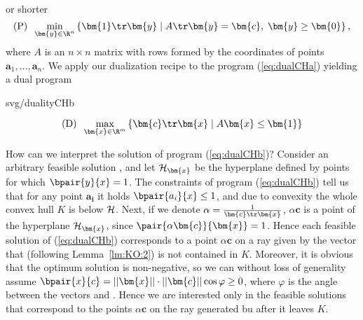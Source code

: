 \noindent
or shorter
$$\text{(P)}\;\; \min_{\bm{y}\in\R^n}\left\{ \bm{1}\tr\bm{y} \mid A\tr\bm{y}=\bm{c},\;\bm{y}\ge\bm{0}\right\}, $$
where $A$ is an $n\times n$ matrix with rows formed by the coordinates of points  $\bm{a}_1,\ldots,\bm{a}_n$.
We apply our dualization recipe to the program (\ref{eq:dualCHa}) yielding a dual program

\noindent
\begin{minipage}[t]{4cm}
  \vspace{0pt}
  \begin{myfig}{\textwidth}{svg/dualityCHb}
  \end{myfig}
\end{minipage}\hspace*{1cm}\begin{minipage}[t]{\textwidth-5cm}
  \vspace{0pt}

\begin{equation}
  \label{eq:dualCHb}
  \text{(D)}\;\;  \max_{\bm{x}\in\R^m}\left\{ \bm{c}\tr\bm{x} \mid A\bm{x}\le\bm{1}\right\}
\end{equation}

\noindent
How can we interpret the solution of program  (\ref{eq:dualCHb})? Consider an arbitrary feasible solution
, and let ${\cal H}_{\bm{x}}$ be the hyperplane defined by points   for which  $\bpair{y}{x}=1$.
The constraints of program  (\ref{eq:dualCHb}) tell us that for any point  $\bm{a_i}$ it holds
$\bpair{a_i}{x}\le1$, and due to convexity the whole convex hull $K$ is below $\cal H$. Next, if we denote
$\alpha=\frac{1}{\bm{c}\tr\bm{x}}$, $\alpha\bm{c}$ is a point of the hyperplane ${\cal H}_{\bm{x}}$,
since $\pair{\alpha\bm{c}}{\bm{x}}=1$. Hence each feasible solution of (\ref{eq:dualCHb})
corresponds to a point $\alpha\bm{c}$ on a ray given by the vector  that (following Lemma~\ref{lm:KO:2})
is not contained in $K$. Moreover, it is obvious that the optimum solution is non-negative, so we can without loss of
generality assume  $\bpair{x}{c}=||\bm{x}||\cdot||\bm{c}||\cos\varphi\ge0$, where $\varphi$
is the angle between the vectors  and . Hence we are interested only in the feasible
solutions that correspond to the points $\alpha\bm{c}$ on the ray generated bu  after it leaves $K$.
\end{minipage}

